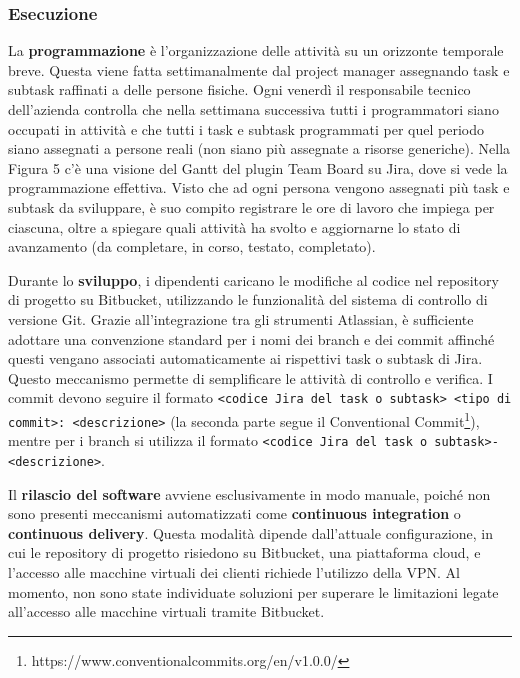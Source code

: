         \subsubsection{Esecuzione}
        La \textbf{programmazione} è l’organizzazione delle attività su un orizzonte temporale breve. Questa viene fatta settimanalmente dal project manager assegnando
        task e subtask raffinati a delle persone fisiche. Ogni venerdì il responsabile tecnico dell’azienda controlla che nella settimana successiva tutti i
        programmatori siano occupati in attività e che tutti i task e subtask programmati per quel periodo siano assegnati a persone reali (non siano più
        assegnate a risorse generiche). Nella Figura 5 c'è una visione del Gantt del plugin Team Board su Jira, dove si vede la programmazione effettiva.
        Visto che ad ogni persona vengono assegnati più task e subtask da sviluppare, è suo compito registrare le ore di lavoro che impiega per ciascuna,
        oltre a spiegare quali attività ha svolto e aggiornarne lo stato di avanzamento (da completare, in corso, testato, completato).

        Durante lo \textbf{sviluppo}, i dipendenti caricano le modifiche al codice nel repository di progetto su Bitbucket, utilizzando le funzionalità del sistema
        di controllo di versione Git. Grazie all’integrazione tra gli strumenti Atlassian, è sufficiente adottare una convenzione standard per i nomi dei
        branch e dei commit affinché questi vengano associati automaticamente ai rispettivi task o subtask di Jira. Questo meccanismo permette di semplificare
        le attività di controllo e verifica. I commit devono seguire il formato \texttt{<codice Jira del task o subtask> <tipo di commit>: <descrizione>} (la
        seconda parte segue il Conventional Commit\footnote{https://www.conventionalcommits.org/en/v1.0.0/}), mentre per i branch si utilizza il formato \texttt{<codice Jira del task o subtask>-<descrizione>}.

        Il \textbf{rilascio del software} avviene esclusivamente in modo manuale, poiché non sono presenti meccanismi automatizzati come \textbf{continuous integration}
        o \textbf{continuous delivery}. Questa modalità dipende dall'attuale configurazione, in cui le repository di progetto risiedono su Bitbucket, una piattaforma
        cloud, e l’accesso alle macchine virtuali dei clienti richiede l’utilizzo della VPN. Al momento, non sono state individuate soluzioni per superare le limitazioni
        legate all'accesso alle macchine virtuali tramite Bitbucket.


